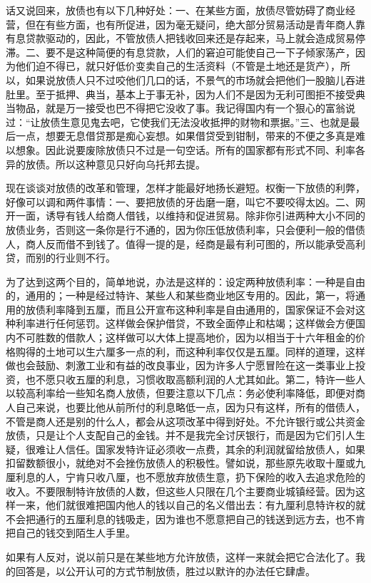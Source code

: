\par 话又说回来，放债也有以下几种好处：一、在某些方面，放债尽管妨碍了商业经营，但在有些方面，也有所促进，因为毫无疑问，绝大部分贸易活动是青年商人靠有息贷款驱动的，因此，不管放债人把钱收回来还是存起来，马上就会造成贸易停滞。二、要不是这种简便的有息贷款，人们的窘迫可能使自己一下子倾家荡产，因为他们迫不得已，就只好低价变卖自己的生活资料（不管是土地还是货产），所以，如果说放债人只不过咬他们几口的话，不景气的市场就会把他们一股脑儿吞进肚里。至于抵押、典当，基本上于事无补，因为人们不是因为无利可图拒不接受典当物品，就是万一接受也巴不得把它没收了事。我记得国内有一个狠心的富翁说过：“让放债生意见鬼去吧，它使我们无法没收抵押的财物和票据。”三、也就是最后一点，想要无息借贷那是痴心妄想。如果借贷受到钳制，带来的不便之多真是难以想象。因此说要废除放债只不过是一句空话。所有的国家都有形式不同、利率各异的放债。所以这种意见只好向乌托邦去提。
\par 现在谈谈对放债的改革和管理，怎样才能最好地扬长避短。权衡一下放债的利弊，好像可以调和两件事情：一、要把放债的牙齿磨一磨，叫它不要咬得太凶。二、网开一面，诱导有钱人给商人借钱，以维持和促进贸易。除非你引进两种大小不同的放债业务，否则这一条你是行不通的，因为你压低放债利率，只会便利一般的借债人，商人反而借不到钱了。值得一提的是，经商是最有利可图的，所以能承受高利贷，而别的行业则不行。
\par 为了达到这两个目的，简单地说，办法是这样的：设定两种放债利率：一种是自由的，通用的；一种是经过特许、某些人和某些商业地区专用的。因此，第一，将通用的放债利率降到五厘，而且公开宣布这种利率是自由通用的，国家保证不会对这种利率进行任何惩罚。这样做会保护借贷，不致全面停止和枯竭；这样做会方便国内不可胜数的借款人；这样做可以大体上提高地价，因为以相当于十六年租金的价格购得的土地可以生六厘多一点的利，而这种利率仅仅是五厘。同样的道理，这样做也会鼓励、刺激工业和有益的改良事业，因为许多人宁愿冒险在这一类事业上投资，也不愿只收五厘的利息，习惯收取高额利润的人尤其如此。第二，特许一些人以较高利率给一些知名商人放债，但要注意以下几点：务必使利率降低，即便对商人自己来说，也要比他从前所付的利息略低一点，因为只有这样，所有的借债人，不管是商人还是别的什么人，都会从这项改革中得到好处。不允许银行或公共资金放债，只是让个人支配自己的金钱。并不是我完全讨厌银行，而是因为它们引人生疑，很难让人信任。国家发特许证必须收一点费，其余的利润就留给放债人，如果扣留数额很小，就绝对不会挫伤放债人的积极性。譬如说，那些原先收取十厘或九厘利息的人，宁肯只收八厘，也不愿放弃放债生意，扔下保险的收入去追求危险的收入。不要限制特许放债的人数，但这些人只限在几个主要商业城镇经营。因为这样一来，他们就很难把国内他人的钱以自己的名义借出去：有九厘利息特许权的就不会把通行的五厘利息的钱吸走，因为谁也不愿意把自己的钱送到远方去，也不肯把自己的钱交到陌生人手里。
\par 如果有人反对，说以前只是在某些地方允许放债，这样一来就会把它合法化了。我的回答是，以公开认可的方式节制放债，胜过以默许的办法任它肆虐。




